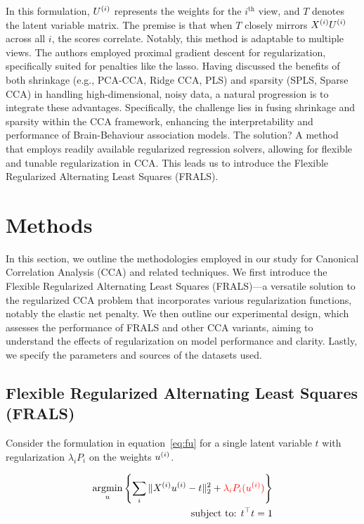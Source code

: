 In this formulation, \(U^{(i)}\) represents the weights for the $i^{\text{th}}$ view, and \(T\) denotes the latent variable matrix.
The premise is that when \(T\) closely mirrors \(X^{(i)} U^{(i)}\) across all \(i\), the scores correlate.
Notably, this method is adaptable to multiple views.
The authors employed proximal gradient descent for regularization, specifically suited for penalties like the lasso.
Having discussed the benefits of both shrinkage (e.g., PCA-CCA, Ridge CCA, PLS) and sparsity (SPLS, Sparse CCA) in handling high-dimensional, noisy data, a natural progression is to integrate these advantages.
Specifically, the challenge lies in fusing shrinkage and sparsity within the CCA framework, enhancing the interpretability and performance of Brain-Behaviour association models.
The solution?
A method that employs readily available regularized regression solvers, allowing for flexible and tunable regularization in CCA.
This leads us to introduce the Flexible Regularized Alternating Least Squares (FRALS).

\section{Methods}

In this section, we outline the methodologies employed in our study for Canonical Correlation Analysis (CCA) and related techniques.
We first introduce the Flexible Regularized Alternating Least Squares (FRALS)—a versatile solution to the regularized CCA problem that incorporates various regularization functions, notably the elastic net penalty\cite{zou2005regularization}.
We then outline our experimental design, which assesses the performance of FRALS and other CCA variants, aiming to understand the effects of regularization on model performance and clarity.
Lastly, we specify the parameters and sources of the datasets used.

\subsection{Flexible Regularized Alternating Least Squares (FRALS)}\label{subsec:flexible-regularized-alternating-least
-squares-(frals)}

Consider the formulation in equation~\ref{eq:fu} for a single latent variable \(t\) with regularization $\lambda_i P_i$ on the weights \(u^{(i)}\).

\begin{align}
    \underset{u}{\mathrm{argmin}}\left\{\sum_i \|X^{(i)} u^{(i)} - t\|_2^2 + \textcolor{red}{\lambda_i P_i(u^{(i)})} \right\}\\
    \text{subject to: }t^\top t = 1\\
\end{align}

